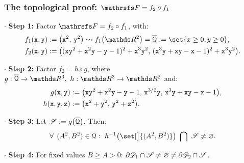 \documentclass{beamer}
\begin{document}
\begin{frame}
\frametitle{The topological proof: $\FFF=f_2\circ f_1$} 
$\cdot$ \textbf{Step 1:} Factor $\FFF=f_2\circ f_1$, with: \vspace{-0.2cm}
\begin{align*}
&f_1(\x,\y):=\big(\x^2,\,\y^2\big) \leadsto f_1\big(\R^2\big)=\overline{\Qu}:=\set{x\ge 0,y\ge 0},\\
&f_2(\x,\y):=\big((\x\y^2+\x^2\y-\y-1)^2+\x^3\y^2,\,(\x^3\y+\x\y-\x-1)^2+\x^3\y^2\big).
\end{align*}\vspace{-0.6cm} 

$\cdot$ \textbf{Step 2:} Factor $f_2=h\circ g$, where $g:\overline{\Qu}\to\R^3,\ h:\R^3\to\R^2$ and: \vspace{-0.2cm}
\begin{align*}
g({\tt x},{\tt y})&:=\big({\tt x}{\tt y}^2+{\tt x}^2{\tt y}-{\tt y}-1,\,{\tt x}^{3/2}{\tt y},\,{\tt x}^3{\tt y}+{\tt x}{\tt y}-{\tt x}-1\big),\\
h({\tt x},{\tt y},{\tt z})&:=\big({\tt x}^2+{\tt y}^2,\,{\tt y}^2+{\tt z}^2\big).
\end{align*}\vspace{-0.6cm} 

$\cdot$ \textbf{Step 3:} Let $\mathscr{S}:=g\big(\overline{\mathcal{Q}}\big)$. Then:  \vspace{-0.2cm}
$$
\forall\, \,  (A^2,B^2)\in\Qu:\ h^{-1}\big(\set[\big]{(A^2,B^2)}\big)\ \bigcap\ \Ss\ne\varnothing.
$$\vspace{-0.6cm}  

$\cdot$ \textbf{Step 4:} For fixed values $B\ge A>0$: $\partial\mathscr{D}_1\cap\mathscr{S} \ne \varnothing \ne \partial\mathscr{D}_2\cap\mathscr{S}$.

\end{frame}
\end{document}
